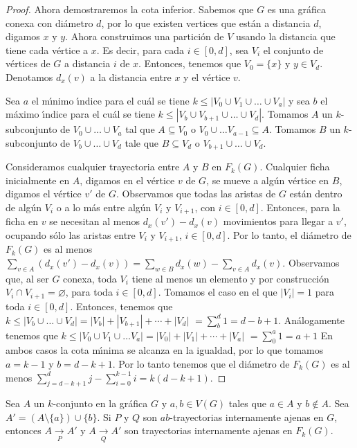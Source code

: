 \begin{proof}
Ahora demostraremos la cota inferior. Sabemos que $G$ es una gr\'afica conexa
con di\'ametro $d$, por lo que existen vertices que est\'an a distancia
$d$, digamos $x$ y $y$. Ahora construimos una partici\'on de $V$ usando  la
distancia que tiene cada v\'ertice a $x$. Es decir, para cada $i\in [0,d]$,
sea $V_{i}$ el conjunto de v\'ertices de $G$ a distancia $i$ de $x$. Entonces,
tenemos que $V_{0}=\{x\}$ y $y\in V_{d}$. Denotamos $d_x(v)$ a la distancia
entre $x$ y el v\'ertice $v$.

Sea $a$ el m\'\i{}nimo \'\i{}ndice para el cu\'al se tiene $k \leq |V_{0}\cup
V_{1}\cup \dots \cup V_{a}|$ y sea $b$ el m\'aximo \'\i{}ndice para el cu\'al se
tiene $k\leq |V_{b}\cup V_{b+1}\cup \dots \cup V_{d}|$. Tomamos $A$ un
$k$-subconjunto de $V_{0}\cup \dots \cup V_{a}$  tal que $A\subseteq
V_{0}$ o $V_{0}\cup \dots V_{a-1}\subseteq A$. Tomamos $B$ un
$k$-subconjunto de $V_{b}\cup \dots \cup V_{d}$ tale que
$B\subseteq V_{d}$ o $V_{b+1}\cup \dots \cup V_{d}$. 

Consideramos cualquier trayectoria entre $A$ y $B$ en $F_{k}(G)$. Cualquier
ficha inicialmente en $A$, digamos en el v\'ertice $v$ de $G$, se mueve a
alg\'un v\'ertice en $B$, digamos el v\'ertice $v'$ de $G$. Observamos que todas
las aristas de $G$ est\'an dentro de alg\'un $V_{i}$ o a lo m\'as entre alg\'un
$V_{i}$ y $V_{i+1}$, con $i\in[0,d]$. Entonces, para la ficha en $v$ se
necesitan al menos $d_x(v')-d_x(v)$ movimientos para llegar a $v'$, ocupando
s\'olo las aristas entre $V_{i}$ y $V_{i+1}$, $i\in [0,d]$. Por lo tanto,
el di\'ametro de $F_{k}(G)$ es al menos $\sum_{v\in A}(d_x(v')-d_x(v))=
\sum_{w\in B}d_x(w)-\sum_{v\in A}d_x(v)$. Observamos que, al ser $G$ conexa,
toda $V_{i}$ tiene al menos un elemento y por construcci\'on $V_{i} \cap
V_{i+1}=\varnothing$, para toda $i\in [0,d]$. Tomamos el caso en el que
$|V_{i}|=1$ para toda $i\in [0,d]$. Entonces, tenemos que $k\leq
|V_{b}\cup\dots\cup V_{d}|=|V_{b}|+|V_{b+1}|+\cdots +|V_d|$
$=\sum_{b}^{d}1 = d -b+1$. An\'alogamente tenemos que $k\leq
|V_{0}\cup V_{1}\cup \dots V_{a}|=|V_{0}|+|V_{1}|+\cdots + |V_{a}|$
$=\sum_{0}^{a} 1 = a+1$ En ambos casos la cota m\'\i{}nima se alcanza en la
igualdad, por lo que tomamos $a=k-1$ y $b=d-k+1$. Por lo tanto tenemos que
el di\'ametro de $F_{k}(G)$ es al menos $\sum_{j=d -k+1}^{d}j -
\sum_{i=0}^{k-1}i = k(d-k+1)$.
\end{proof}


\begin{lema}%
\label{lem:relacion trayectorias int. ajenas de G y F(G)}
Sea $A$ un $k$-conjunto en la gr\'afica $G$ y $a, b \in V(G)$ tales que $a \in
A$ y $b \notin A$. Sea $A' = (A \setminus \{ a \}) \cup \{ b \}$. Si $P$ y $Q$
son $ab$-trayectorias internamente ajenas en $G$, entonces $A \xrightarrow[P]{}
A'$ y $A \xrightarrow[Q]{} A'$ son trayectorias internamente ajenas en
$F_{k}(G)$.
\end{lema}

